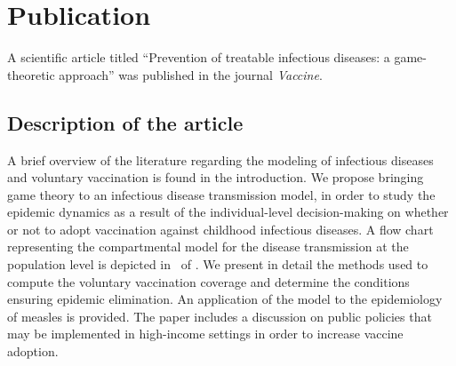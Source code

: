 %

\section{Publication}
\label{Vaccine:Article}

A scientific article titled ``Prevention of treatable infectious diseases: a game-theoretic approach'' \cite[]{Jijon2017} was published in the journal \textit{Vaccine}. %

\subsection{Description of the article}
A brief overview of the literature regarding the modeling of infectious diseases and voluntary vaccination is found in the introduction. We propose bringing game theory to an infectious disease transmission model, in order to study the epidemic dynamics as a result of the individual-level decision-making on whether or not to adopt vaccination against childhood infectious diseases. A flow chart representing the compartmental model for the disease transmission at the population level is depicted in~ of  . We present in detail the methods used to compute the voluntary vaccination coverage and determine the conditions ensuring epidemic elimination. 
An application of the model to the epidemiology of measles is provided. The paper includes a discussion on public policies that may be implemented in high-income settings in order to increase vaccine adoption.

